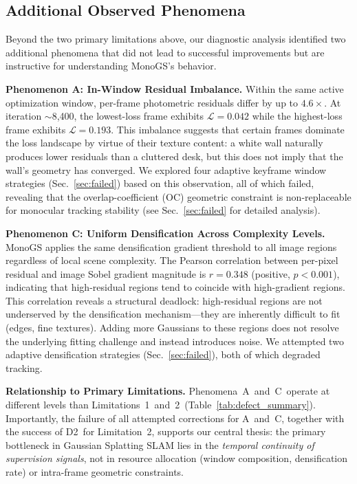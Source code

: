 \documentclass[conference]{IEEEtran}
\begin{document}
\subsection{Additional Observed Phenomena}
\label{sec:lim3}

Beyond the two primary limitations above, our diagnostic analysis identified two additional phenomena that did not lead to successful improvements but are instructive for understanding MonoGS's behavior.

\textbf{Phenomenon A: In-Window Residual Imbalance.}
Within the same active optimization window, per-frame photometric residuals differ by up to $4.6\times$.
At iteration $\sim$8,400, the lowest-loss frame exhibits $\mathcal{L}=0.042$ while the highest-loss frame exhibits $\mathcal{L}=0.193$.
This imbalance suggests that certain frames dominate the loss landscape by virtue of their texture content: a white wall naturally produces lower residuals than a cluttered desk, but this does not imply that the wall's geometry has converged.
We explored four adaptive keyframe window strategies (Sec.~\ref{sec:failed}) based on this observation, all of which failed, revealing that the overlap-coefficient (OC) geometric constraint is non-replaceable for monocular tracking stability (see Sec.~\ref{sec:failed} for detailed analysis).

\textbf{Phenomenon C: Uniform Densification Across Complexity Levels.}
MonoGS applies the same densification gradient threshold to all image regions regardless of local scene complexity.
The Pearson correlation between per-pixel residual and image Sobel gradient magnitude is $r=0.348$ (positive, $p < 0.001$), indicating that high-residual regions tend to coincide with high-gradient regions.
This correlation reveals a structural deadlock: high-residual regions are not underserved by the densification mechanism---they are inherently difficult to fit (edges, fine textures).
Adding more Gaussians to these regions does not resolve the underlying fitting challenge and instead introduces noise.
We attempted two adaptive densification strategies (Sec.~\ref{sec:failed}), both of which degraded tracking.

\textbf{Relationship to Primary Limitations.}
Phenomena~A~and~C~operate at different levels than Limitations~1~and~2~(Table~\ref{tab:defect_summary}).
Importantly, the failure of all attempted corrections for A~and~C, together with the success of {D2}~for Limitation~2, supports our central thesis: the primary bottleneck in Gaussian Splatting SLAM lies in the \textit{temporal continuity of supervision signals}, not in resource allocation (window composition, densification rate) or intra-frame geometric constraints.
\end{document}
